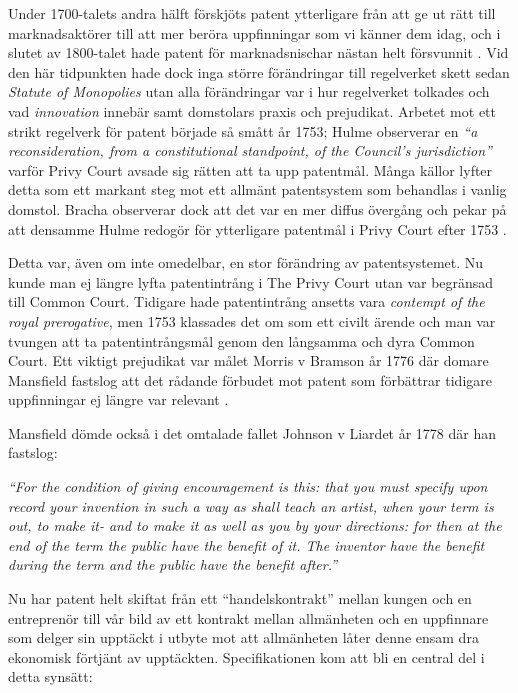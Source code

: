 Under 1700-talets andra hälft förskjöts patent ytterligare från att ge ut rätt till marknadsaktörer till att mer beröra uppfinningar som vi känner dem idag, och i slutet av 1800-talet hade patent för marknadsnischar nästan helt försvunnit \cite{bracha}. 
Vid den här tidpunkten hade dock inga större förändringar till regelverket skett sedan \emph{Statute of Monopolies}
utan alla förändringar var i hur regelverket tolkades och vad \emph{innovation} innebär samt domstolars praxis och prejudikat. Arbetet mot ett strikt regelverk för patent började så smått år 1753; Hulme \cite{hulme3} observerar en \emph{``a reconsideration, from a constitutional standpoint, of the Council’s jurisdiction''} varför Privy Court avsade sig rätten att ta upp patentmål. Många källor lyfter detta som ett markant steg mot ett allmänt patentsystem som behandlas i vanlig domstol. Bracha observerar dock att det var en mer diffus övergång och pekar på att densamme Hulme redogör för ytterligare patentmål i Privy Court efter 1753 \cite{bracha}.

Detta var, även om inte omedelbar, en stor förändring av patentsystemet. Nu kunde man ej längre lyfta patentintrång i The Privy Court utan var begränsad till Common Court. Tidigare hade patentintrång ansetts vara \emph{contempt of the royal prerogative}, men 1753 klassades det om som ett civilt ärende och man var tvungen att ta patentintrångsmål genom den långsamma och dyra Common Court. Ett viktigt prejudikat var målet Morris v Bramson år 1776 där domare Mansfield fastslog att det rådande förbudet mot patent som förbättrar tidigare uppfinningar ej längre var relevant \cite{bracha}.

Mansfield dömde också i det omtalade fallet Johnson v Liardet år 1778 där han fastslog:

\emph{``For the condition of giving encouragement is this: that 
you must specify upon record your invention in such a 
way as shall teach an artist, when your term is out, to 
make it- and to make it as well as you by your directions: 
for then at the end of the term the public have the benefit 
of it. The inventor have the benefit during the term and 
the public have the benefit after.''} \cite{hulme1}

Nu har patent helt skiftat från ett ``handelskontrakt'' mellan kungen och en entreprenör till vår bild av ett kontrakt mellan allmänheten och en uppfinnare som delger sin upptäckt i utbyte mot att allmänheten låter denne ensam dra ekonomisk förtjänt av upptäckten. Specifikationen kom att bli en central del i detta synsätt: 

